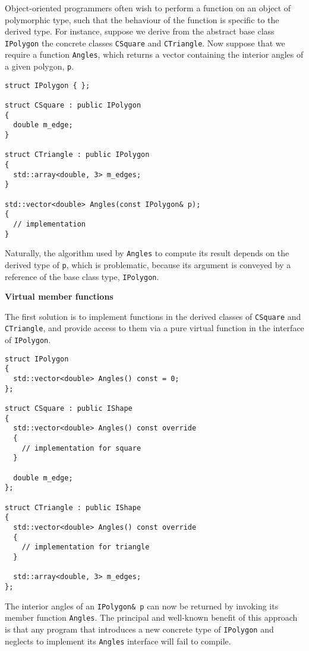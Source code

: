\documentclass[10pt,a4paper,twocolumn]{article}
\renewcommand\section[1]{
    \begin{minipage}[c]{0.94\linewidth}
    \large \raggedright \sffamily \textbf{#1}
    \end{minipage}
}
\newcommand\mycode[1]{{\small\texttt{#1}}}
\begin{document}
Object-oriented programmers often wish to perform a function on an object of polymorphic type, such that the behaviour of the function is specific to the derived type. For instance, suppose we derive from the abstract base class \mycode{IPolygon} the concrete classes \mycode{CSquare} and \mycode{CTriangle}. Now suppose that we require a function \mycode{Angles}, which returns a vector containing the interior angles of a given polygon, \mycode{p}.

{\small\begin{verbatim}
struct IPolygon { };

struct CSquare : public IPolygon
{
  double m_edge;
}

struct CTriangle : public IPolygon
{
  std::array<double, 3> m_edges;
}

std::vector<double> Angles(const IPolygon& p);
{
  // implementation
}
\end{verbatim}}

Naturally, the algorithm used by \mycode{Angles} to compute its result depends on the derived type of \mycode{p}, which is problematic, because its argument is conveyed by a reference of the base class type, \mycode{IPolygon}.


\section{Virtual member functions}

The first solution is to implement functions in the derived classes of \mycode{CSquare} and \mycode{CTriangle}, and provide access to them via a pure virtual function in the interface of \mycode{IPolygon}.

{\small\begin{verbatim}
struct IPolygon
{
  std::vector<double> Angles() const = 0;
};

struct CSquare : public IShape
{
  std::vector<double> Angles() const override
  {
    // implementation for square
  }

  double m_edge;
};

struct CTriangle : public IShape
{
  std::vector<double> Angles() const override
  {
    // implementation for triangle
  }

  std::array<double, 3> m_edges;
};
\end{verbatim}}

The interior angles of an \mycode{IPolygon\& p} can now be returned by invoking its member function \mycode{Angles}. The principal and well-known benefit of this approach is that any program that introduces a new concrete type of \mycode{IPolygon} and neglects to implement its \mycode{Angles} interface will fail to compile.
\end{document}
